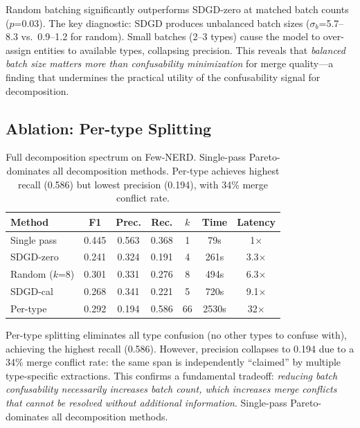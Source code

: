 \documentclass[11pt,a4paper]{article}
\begin{document}
Random batching significantly outperforms SDGD-zero at matched batch counts ($p$=0.03). The key diagnostic: SDGD produces unbalanced batch sizes ($\sigma_b$=5.7--8.3 vs.\ 0.9--1.2 for random). Small batches (2--3 types) cause the model to over-assign entities to available types, collapsing precision. This reveals that \emph{balanced batch size matters more than confusability minimization} for merge quality---a finding that undermines the practical utility of the confusability signal for decomposition.

\subsection{Ablation: Per-type Splitting}
\label{sec:pertype}

\begin{table}[h]
\centering
\small
\begin{tabular}{@{}lcccccc@{}}
\toprule
\textbf{Method} & \textbf{F1} & \textbf{Prec.} & \textbf{Rec.} & $k$ & \textbf{Time} & \textbf{Latency} \\
\midrule
Single pass & 0.445 & 0.563 & 0.368 & 1 & 79s & 1$\times$ \\
SDGD-zero & 0.241 & 0.324 & 0.191 & 4 & 261s & 3.3$\times$ \\
Random ($k$=8) & 0.301 & 0.331 & 0.276 & 8 & 494s & 6.3$\times$ \\
SDGD-cal & 0.268 & 0.341 & 0.221 & 5 & 720s & 9.1$\times$ \\
Per-type & 0.292 & 0.194 & 0.586 & 66 & 2530s & 32$\times$ \\
\bottomrule
\end{tabular}
\caption{Full decomposition spectrum on Few-NERD. Single-pass Pareto-dominates all decomposition methods. Per-type achieves highest recall (0.586) but lowest precision (0.194), with 34\% merge conflict rate.}
\label{tab:decomposition_spectrum}
\end{table}

Per-type splitting eliminates all type confusion (no other types to confuse with), achieving the highest recall (0.586). However, precision collapses to 0.194 due to a 34\% merge conflict rate: the same span is independently ``claimed'' by multiple type-specific extractions. This confirms a fundamental tradeoff: \emph{reducing batch confusability necessarily increases batch count, which increases merge conflicts that cannot be resolved without additional information}. Single-pass Pareto-dominates all decomposition methods.
\end{document}
